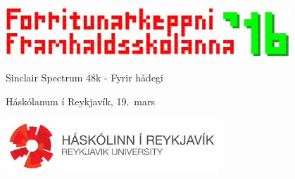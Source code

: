 \documentclass[12pt,a4paper]{problemset}
\begin{document}
\begin{titlepage}
    \centering
    \includegraphics[width=0.8\textwidth]{fklogo}\\
    \vspace{1cm}
    {\Huge Sinclair Spectrum 48k - Fyrir hádegi \par}
    \vspace{0.5cm}
    {\LARGE Háskólanum í Reykjavík, 19.\ mars \par}
    \vspace{2cm}
    { \Huge \tableofcontents }
    \vfill
    \includegraphics[width=0.6\textwidth]{horizontal_white.png}
\end{titlepage}

\end{document}
